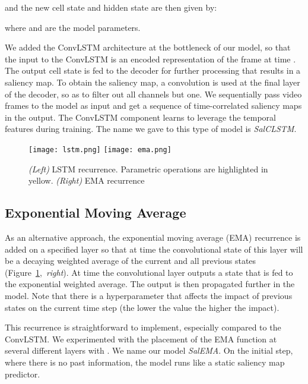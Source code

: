 \documentclass{bmvc2k}
\begin{document}
and the new cell state  and hidden state  are then given by:

where  and  are the model parameters. 


We added the ConvLSTM architecture at the bottleneck of our model, so that the input to the ConvLSTM is an encoded representation of the frame at time . The output cell state  is fed to the decoder for further processing that results in a saliency map. To obtain the saliency map, a  convolution is used at the final layer of the decoder, so as to filter out all channels but one. We sequentially pass video frames to the model as input and get a sequence of time-correlated saliency maps in the output. The ConvLSTM component learns to leverage the temporal features during training. The name we gave to this type of model is \textit{SalCLSTM}.


\begin{figure}[t]
\begin{center}
\texttt{[image: lstm.png]}
\texttt{[image: ema.png]}
\end{center}
\caption{\textit{(Left)} LSTM recurrence. Parametric operations are highlighted in yellow. \textit{(Right)} EMA recurrence}
\label{figEMA_LSTM}
\end{figure}

\subsection{Exponential Moving Average} 
As an alternative approach, the exponential moving average (EMA) recurrence \cite{EMA} is added on a specified layer so that at time  the convolutional state of this layer will be a decaying weighted average of the current and all previous states (Figure~\ref{figEMA_LSTM},~\textit{right}). At time  the convolutional layer  outputs a state that is fed to the exponential weighted average. The output  is then propagated further in the model. Note that there is a hyperparameter  that affects the impact of previous states on the current time step (the lower the value the higher the impact).


This recurrence is straightforward to implement, especially compared to the ConvLSTM. We experimented with the placement of the EMA function at several different layers with . We name our model \textit{SalEMA}. On the initial step, where there is no past information, the model runs like a static saliency map predictor. 
\end{document}
